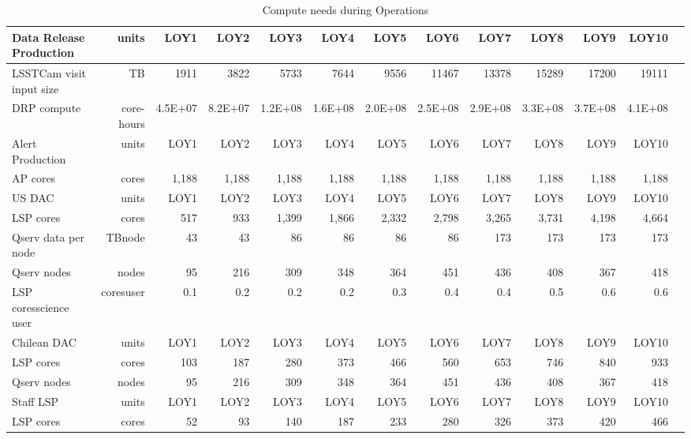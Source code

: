 \tiny \begin{longtable} { |p{}  |r  |r  |r  |r  |r  |r  |r  |r  |r  |r  |r  |r |} 
\caption{Compute needs during Operations \label{tab:computeSizingOps}}\\ 
\hline 
\textbf{Data Release Production}&\textbf{units}&\textbf{LOY1}&\textbf{LOY2}&\textbf{LOY3}&\textbf{LOY4}&\textbf{LOY5}&\textbf{LOY6}&\textbf{LOY7}&\textbf{LOY8}&\textbf{LOY9}&\textbf{LOY10} \\ \hline
{LSSTCam visit input size}&{TB}&{1911}&{3822}&{5733}&{7644}&{9556}&{11467}&{13378}&{15289}&{17200}&{19111} \\ \hline
{DRP compute}&{core-hours}&{4.5E+07}&{8.2E+07}&{1.2E+08}&{1.6E+08}&{2.0E+08}&{2.5E+08}&{2.9E+08}&{3.3E+08}&{3.7E+08}&{4.1E+08} \\ \hline
{Alert Production}&{units}&{LOY1}&{LOY2}&{LOY3}&{LOY4}&{LOY5}&{LOY6}&{LOY7}&{LOY8}&{LOY9}&{LOY10} \\ \hline
{AP cores}&{cores}&{1,188}&{1,188}&{1,188}&{1,188}&{1,188}&{1,188}&{1,188}&{1,188}&{1,188}&{1,188} \\ \hline
{US DAC}&{units}&{LOY1}&{LOY2}&{LOY3}&{LOY4}&{LOY5}&{LOY6}&{LOY7}&{LOY8}&{LOY9}&{LOY10} \\ \hline
{LSP cores}&{cores}&{517}&{933}&{1,399}&{1,866}&{2,332}&{2,798}&{3,265}&{3,731}&{4,198}&{4,664} \\ \hline
{Qserv data per node}&{TB\/node}&{43}&{43}&{86}&{86}&{86}&{86}&{173}&{173}&{173}&{173} \\ \hline
{Qserv nodes}&{nodes}&{95}&{216}&{309}&{348}&{364}&{451}&{436}&{408}&{367}&{418} \\ \hline
{LSP cores\/science user}&{cores\/user}&{0.1}&{0.2}&{0.2}&{0.2}&{0.3}&{0.4}&{0.4}&{0.5}&{0.6}&{0.6} \\ \hline
{Chilean DAC}&{units}&{LOY1}&{LOY2}&{LOY3}&{LOY4}&{LOY5}&{LOY6}&{LOY7}&{LOY8}&{LOY9}&{LOY10} \\ \hline
{LSP cores}&{cores}&{103}&{187}&{280}&{373}&{466}&{560}&{653}&{746}&{840}&{933} \\ \hline
{Qserv nodes}&{nodes}&{95}&{216}&{309}&{348}&{364}&{451}&{436}&{408}&{367}&{418} \\ \hline
{Staff LSP}&{units}&{LOY1}&{LOY2}&{LOY3}&{LOY4}&{LOY5}&{LOY6}&{LOY7}&{LOY8}&{LOY9}&{LOY10} \\ \hline
{LSP cores}&{cores}&{52}&{93}&{140}&{187}&{233}&{280}&{326}&{373}&{420}&{466} \\ \hline
\end{longtable} \normalsize
